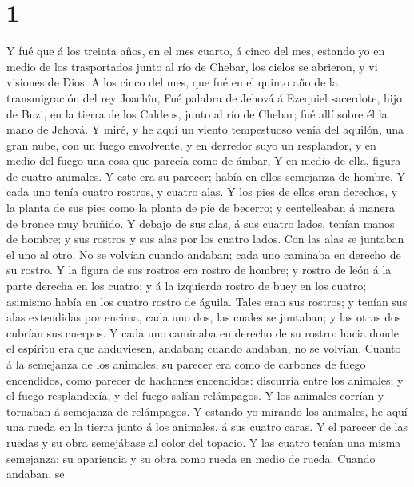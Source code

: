 \hypertarget{section}{%
\section{1}\label{section}}

 Y fué que á los treinta años, en el mes cuarto, á cinco del
mes, estando yo en medio de los trasportados junto al río de Chebar, los
cielos se abrieron, y vi visiones de Dios.  A los cinco del
mes, que fué en el quinto año de la transmigración del rey Joachîn,
 Fué palabra de Jehová á Ezequiel sacerdote, hijo de Buzi,
en la tierra de los Caldeos, junto al río de Chebar; fué allí sobre él
la mano de Jehová.  Y miré, y he aquí un viento tempestuoso
venía del aquilón, una gran nube, con un fuego envolvente, y en derredor
suyo un resplandor, y en medio del fuego una cosa que parecía como de
ámbar,  Y en medio de ella, figura de cuatro animales. Y
este era su parecer; había en ellos semejanza de hombre.  Y
cada uno tenía cuatro rostros, y cuatro alas.  Y los pies de
ellos eran derechos, y la planta de sus pies como la planta de pie de
becerro; y centelleaban á manera de bronce muy bruñido.  Y
debajo de sus alas, á sus cuatro lados, tenían manos de hombre; y sus
rostros y sus alas por los cuatro lados.  Con las alas se
juntaban el uno al otro. No se volvían cuando andaban; cada uno caminaba
en derecho de su rostro.  Y la figura de sus rostros era
rostro de hombre; y rostro de león á la parte derecha en los cuatro; y á
la izquierda rostro de buey en los cuatro; asimismo había en los cuatro
rostro de águila.  Tales eran sus rostros; y tenían sus
alas extendidas por encima, cada uno dos, las cuales se juntaban; y las
otras dos cubrían sus cuerpos.  Y cada uno caminaba en
derecho de su rostro: hacia donde el espíritu era que anduviesen,
andaban; cuando andaban, no se volvían.  Cuanto á la
semejanza de los animales, su parecer era como de carbones de fuego
encendidos, como parecer de hachones encendidos: discurría entre los
animales; y el fuego resplandecía, y del fuego salían relámpagos.
 Y los animales corrían y tornaban á semejanza de
relámpagos.  Y estando yo mirando los animales, he aquí una
rueda en la tierra junto á los animales, á sus cuatro caras.
 Y el parecer de las ruedas y su obra semejábase al color
del topacio. Y las cuatro tenían una misma semejanza: su apariencia y su
obra como rueda en medio de rueda.  Cuando andaban, se

